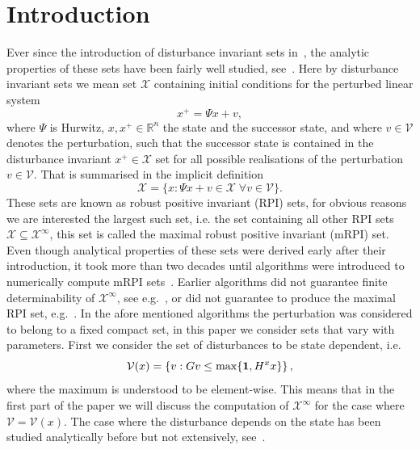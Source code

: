 \documentclass[letterpaper, 10pt, conference]{ieeeconf} %
\begin{document}
\section{Introduction}
Ever since the introduction of disturbance invariant sets in~\cite{Glover:1971}, the analytic
properties of these sets have been fairly well studied, see~\cite{blanchini:2007}. Here by disturbance
invariant sets we mean set $\mathscr X$ containing initial conditions for the perturbed linear system
\begin{equation}\label{eq:system:equation}
	x^+ = \Psi x + v,
\end{equation}
where $\Psi$ is Hurwitz, $x,x^+\in\mathbb R^n$ the state and the successor state, and where 
$v\in\mathscr V$ denotes the perturbation, such that the successor state is contained in the 
disturbance invariant $x^+\in\mathscr X$ set for all possible realisations of the 
perturbation $v\in\mathscr V$. That is summarised in the implicit definition
\begin{equation}\label{eq:definition:mrpi:set:state:dependent}
	\mathscr X = \{x:\Psi x + v\in\mathscr X\; \forall v\in\mathscr V\}.
\end{equation}
These sets are known as robust positive invariant (RPI) sets, for obvious reasons we are interested 
the largest such set, i.e. the set containing all other RPI sets $\mathscr X\subseteq\mathcal X^\infty$,
this set is called the maximal robust positive invariant (mRPI) set. Even though analytical properties
of these sets were derived early after their introduction, it took more than two decades until algorithms
were introduced to numerically compute mRPI sets~\cite{DeSantis:1994,Kolmanovsky:1995,Blanchini:1994}. Earlier algorithms
did not guarantee finite determinability of $\mathcal X^\infty$, see e.g.~\cite{Blanchini:1990}, or 
did not guarantee to produce the maximal RPI set, e.g.~\cite{Blanchini:1991}. 
%
In the afore mentioned algorithms the perturbation was considered to belong to a fixed compact set, in this paper
we consider sets that vary with parameters. First we consider the set of disturbances to be state dependent, i.e.
\begin{equation}\label{eq:PWA:distrubance:set}
	\mathcal V(x) = \left\{v: Gv\leq\max\{{\bf{1}},H^x x\}\right\},
\end{equation}
where the maximum is understood to be element-wise. This means that in the first part of the paper
we will discuss the computation of $\mathcal X^\infty$ for the case where $\mathscr V=\mathcal V(x)$.
The case where the disturbance depends on the state has been studied analytically before but not 
extensively, see~\cite{Kuntsevich:1995}.
\end{document}

